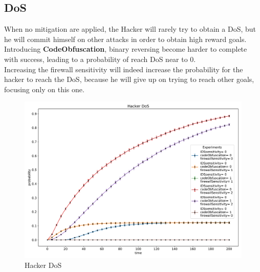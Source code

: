 \subsection*{DoS}
When no mitigation are applied, the Hacker will rarely try to obtain a DoS, but he will commit himself
on other attacks in order to obtain high reward goals. Introducing \textbf{CodeObfuscation}, binary reversing
become harder to complete with success, leading to a probability of reach DoS near to 0.\\
Increasing the firewall sensitivity will indeed increase the probability for the hacker to reach the DoS,
because he will give up on trying to reach other goals, focusing only on this one.
\begin{figure}[H]
    \begin{center}
        \includegraphics[scale=0.45]{img/Hacker_DoS.pdf}
    \end{center}
    \caption{Hacker DoS}
    \label{fig:Hacker_DoS}
    \vspace*{-0.8cm}
\end{figure}
\newpage

